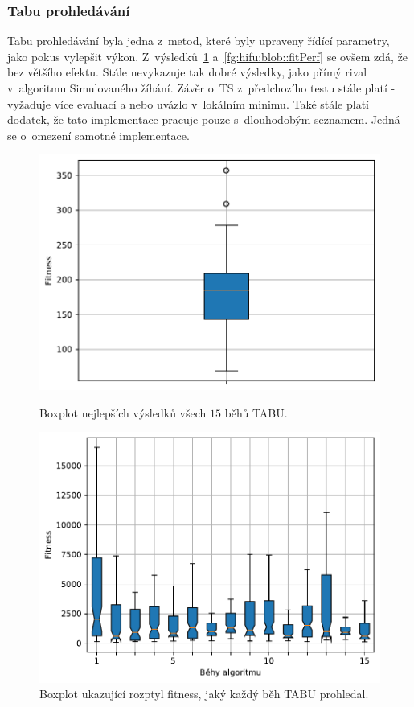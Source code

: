 \subsubsection{Tabu prohledávání}
Tabu prohledávání byla jedna z~metod, které byly upraveny řídící parametry, jako pokus vylepšit výkon. Z~výsledků~\ref{fg:hifu:blob:tabu:lastGen} a~\ref{fg:hifu:blob::fitPerf} se ovšem zdá, že bez většího efektu. Stále nevykazuje tak dobré výsledky, jako přímý rival v~algoritmu Simulovaného žíhání. Závěr o~TS z~předchozího testu stále platí - vyžaduje více evaluací a nebo uvázlo v~lokálním minimu. Také stále platí dodatek, že tato implementace pracuje pouze s~dlouhodobým seznamem. Jedná se o~omezení samotné implementace.

\begin{figure}[H]
\begin{minipage}[t]{0.475\linewidth}
\includegraphics[width=\linewidth]{obrazky-figures/statistics/HIFU/blob/20/TABU/bestsBoxplot_WithOutliers.pdf}
\caption{Boxplot nejlepších výsledků všech $15$ běhů TABU.}
\label{fg:hifu:blob:tabu:best}
\end{minipage}
\hfill
\begin{minipage}[t]{0.475\linewidth}
\includegraphics[width=\linewidth]{obrazky-figures/statistics/HIFU/blob/20/TABU/lastGenBoxplots.pdf}
\caption{Boxplot ukazující rozptyl fitness, jaký každý běh TABU prohledal.}
\label{fg:hifu:blob:tabu:lastGen}
\end{minipage}
\end{figure}

